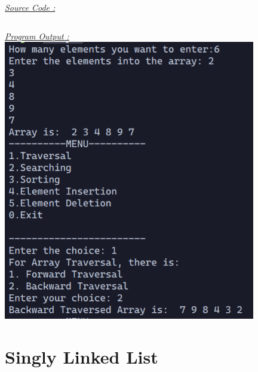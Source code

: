 \documentclass{report}
\begin{document}
\bigbreak
\underline{\emph{\Large Source Code :}}
\inputminted[breaklines]{c}{../Array/array.c}
\bigbreak
\noindent
\underline{\emph{\Large Program Output :}}
\bigbreak
\noindent
\includegraphics[width=110mm,scale=0.5]{../Array/outputs/array.png}


\chapter{Singly Linked List}
\end{document}
